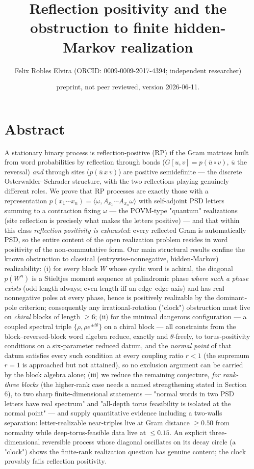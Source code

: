 \documentclass[11pt]{article}
\title{Reflection positivity and the obstruction to finite hidden-Markov realization}
\author{Felix Robles Elvira (ORCID: 0009-0009-2017-4394; independent researcher)}
\date{\small preprint, not peer reviewed, version 2026-06-11.}
\begin{document}
\maketitle

\section*{Abstract}
A stationary binary process is reflection-positive (RP) if the Gram matrices built from word probabilities by reflection through bonds ($G[u,v] = p(\bar u \circ v)$, $\bar u$ the reversal) \emph{and} through sites ($p(\bar u\,x\,v)$) are positive semidefinite — the discrete Osterwalder–Schrader structure, with the two reflections playing genuinely different roles.  We prove that RP processes are exactly those with a representation $p(x_1\cdots x_n) = \langle\omega, A_{x_1}\cdots A_{x_n}\omega\rangle$ with self-adjoint PSD letters summing to a contraction fixing $\omega$ — the POVM-type "quantum" realizations (site reflection is precisely what makes the letters positive) — and that within this class \emph{reflection positivity is exhausted}: every reflected Gram is automatically PSD, so the entire content of the open realization problem resides in word positivity of the non-commutative form.  Our main structural results confine the known obstruction to classical (entrywise-nonnegative, hidden-Markov) realizability: (i) for every block $W$ whose cyclic word is achiral, the diagonal $p(W^n)$ is a Stieltjes moment sequence at palindromic phase \emph{where such a phase exists} (odd length always; even length iff an edge–edge axis) and has real nonnegative poles at every phase, hence is positively realizable by the dominant-pole criterion; consequently any irrational-rotation ("clock") obstruction must live on \emph{chiral} blocks of length $\ge 6$; (ii) for the minimal dangerous configuration — a coupled spectral triple $\{\rho, \rho e^{\pm i\theta}\}$ on a chiral block — all constraints from the block–reversed-block word algebra reduce, exactly and $\theta$-freely, to torus-positivity conditions on a six-parameter reduced datum, and the \emph{normal point} of that datum satisfies every such condition at every coupling ratio $r < 1$ (the supremum $r = 1$ is approached but not attained), so no exclusion argument can be carried by the block algebra alone; (iii) we reduce the remaining conjecture, \emph{for rank-three blocks} (the higher-rank case needs a named strengthening stated in Section 6), to two sharp finite-dimensional statements — "normal words in two PSD letters have real spectrum" and "all-depth torus feasibility is isolated at the normal point" — and supply quantitative evidence including a two-walls separation: letter-realizable near-triples live at Gram distance $\ge 0.50$ from normality while deep-torus-feasible data live at $\le 0.15$.  An explicit three-dimensional reversible process whose diagonal oscillates on its decay circle (a "clock") shows the finite-rank realization question has genuine content; the clock provably fails reflection positivity.
\end{document}
